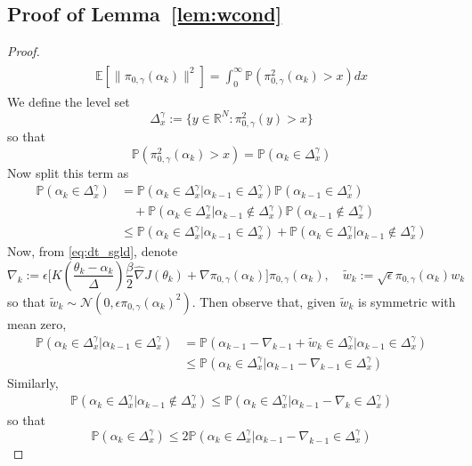 \documentclass[journal,onecolumn]{IEEEtran}
\newcommand{\alk}{\alpha_k}
\newcommand{\alkm}{\alpha_{k-1}}
\newcommand{\thk}{\theta_k}
\newcommand{\step}{\epsilon}
\newcommand{\kernel}{K\left(\frac{\theta_k -\alk}{\Delta}\right)}
\newcommand{\grad}{\nabla}
\newcommand{\gradn}{\hat{\nabla}}
\newcommand{\rew}{J}
\newcommand{\gaus}{\mathcal{N}}
\newcommand{\reals}{\mathbb{R}}
\newcommand{\CE}{\mathbb{E}}
\newcommand{\PR}{\mathbb{P}}
\newcommand{\dimn}{N}
\newcommand{\idistr}{\ids_0}
\newcommand{\ids}{\pi}
\newcommand{\idw}{\gamma}
\newcommand{\isp}{0,\idw}
\newcommand{\levxw}{\Delta_{x}^{\idw}}
\newcommand{\idistrw}{\ids_{\isp}}
\begin{document}
{\subsection*{Proof of Lemma~\ref{lem:wcond}}
\begin{proof}
\begin{align*}
\begin{split}
    \CE\left[\|\idistrw(\alk)\|^2\right] = \int_0^{\infty}\PR\left( \idistrw^2(\alk) > x\right)dx
\end{split}
\end{align*}
We define the level set \[\levxw := \{y\in\reals^{\dimn} : \idistrw^2(y) > x\}\]
so that \[\PR\left(\idistrw^2(\alk) > x\right) = \PR(\alk \in \levxw)\]
Now split this term as
\begin{align*}
\PR(\alk \in \levxw) &= \PR(\alk \in \levxw | \alkm \in \levxw)\PR(\alkm \in \levxw) \\& \quad + \PR(\alk \in \levxw | \alkm \notin \levxw)\PR(\alkm \notin \levxw) \\
& \leq \PR(\alk \in \levxw | \alkm \in \levxw) + \PR(\alk \in \levxw | \alkm \notin \levxw)
\end{align*}
Now, from \eqref{eq:dt_sgld}, denote
\[\grad_k := \step\biggl[\kernel \frac{\beta}{2} \gradn \rew (\thk) + \grad \idistrw(\alk)\biggr]\idistrw(\alk), \quad  \tilde{w}_k := \sqrt{\step}\idistrw(\alk) w_k\]
so that $\tilde{w}_k \sim \gaus(0,\step\idistrw(\alk)^2)$. Then observe that, given $\tilde{w}_k$ is symmetric with mean zero,
\begin{align*}
    \PR(\alk \in \levxw | \alkm \in \levxw) &= \PR(\alkm - \grad_{k-1} + \tilde{w}_k \in \levxw | \alkm \in \levxw) \\&\leq \PR(\alk \in \levxw | \alkm - \grad_{k-1} \in \levxw)
\end{align*}
Similarly,
\begin{align*}
    \PR(\alk \in \levxw | \alkm \notin \levxw) \leq \PR(\alk \in \levxw | \alkm - \grad_k \in \levxw)
\end{align*}
so that \[\PR(\alk \in \levxw) \leq 2\PR(\alk \in \levxw | \alkm - \grad_{k-1} \in \levxw)\]


\end{proof}}
\end{document}
